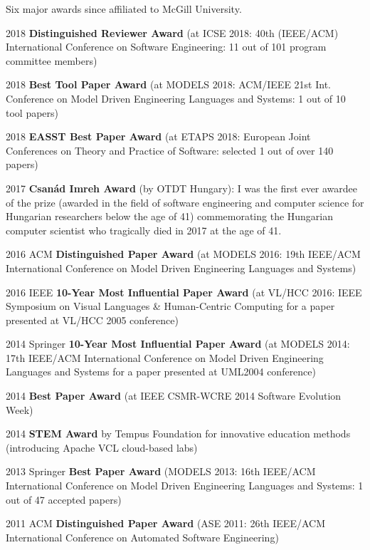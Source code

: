 Six major awards since affiliated to McGill University. 
\begin{yearlist}
\item[2018] \textbf{Distinguished Reviewer Award} (at ICSE 2018: 40th (IEEE/ACM) International Conference on Software Engineering: 11 out of 101 program committee members)
\item[2018] \textbf{Best Tool Paper Award} (at MODELS 2018: ACM/IEEE 21st Int. Conference on Model Driven Engineering Languages and Systems: 1 out of 10 tool papers)
\item[2018] \textbf{EASST Best Paper Award} (at ETAPS 2018: European Joint Conferences on Theory and Practice of Software: selected 1 out of over 140 papers)
\item[2017] \textbf{Csanád Imreh Award} (by OTDT Hungary): \newline I was the first ever awardee of the prize (awarded in the field of software engineering and computer science for Hungarian researchers below the age of 41) commemorating the Hungarian computer scientist who tragically died in 2017 at the age of 41.  
\item[2016] ACM \textbf{Distinguished Paper Award} (at MODELS 2016: 19th IEEE/ACM International Conference on Model Driven Engineering Languages and Systems) 
\item[2016] IEEE \textbf{10-Year Most Influential Paper Award} \newline (at VL/HCC 2016: IEEE Symposium on Visual Languages \& Human-Centric Computing for a paper presented at VL/HCC 2005 conference) 
\item[2014] Springer \textbf{10-Year Most Influential Paper Award} \newline (at MODELS 2014: 17th IEEE/ACM International Conference on Model Driven Engineering Languages and Systems for a paper presented at UML2004 conference) 
\item[2014] \textbf{Best Paper Award} (at IEEE CSMR-WCRE 2014 Software Evolution Week) 
\item[2014] \textbf{STEM Award} by Tempus Foundation for innovative education methods (introducing Apache VCL cloud-based labs)
\item[2013] Springer \textbf{Best Paper Award} (MODELS 2013: 16th IEEE/ACM International Conference on Model Driven Engineering Languages and Systems: 1 out of 47 accepted papers) 
\item[2011] ACM \textbf{Distinguished Paper Award} (ASE 2011: 26th IEEE/ACM International Conference on Automated Software Engineering) 

\end{yearlist}

